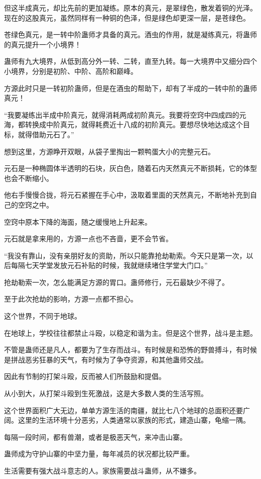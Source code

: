 \begin{this_body}
但这半成真元，却比先前的更加凝练。原本的真元，是翠绿色，散发着铜的光泽。现在的这股真元，虽然同样有一种铜的色泽，但是绿色却更深一层，是苍绿色。

苍绿色真元，是一转中阶蛊师才具备的真元。酒虫的作用，就是凝练真元，将蛊师的真元提升一个小境界！

蛊师有九大境界，从低到高分外一转、二转，直至九转。每一大境界中又细分四个小境界，分别是初阶、中阶、高阶和巅峰。

方源此时只是一转初阶蛊师，但是在酒虫的帮助下，却有了半成的一转中阶的蛊师真元！

“我要凝练出半成中阶真元，就得消耗两成初阶真元。我要将空窍中四成四的元海，都转换成中阶真元，就得耗费近十八成的初阶真元。要想尽快地达成这个目标，就得借助元石了。”

想到这里，方源睁开双眼，从袋子里掏出一颗鸭蛋大小的完整元石。

元石是一种椭圆体半透明的石块，灰白色，随着石内天然真元不断损耗，它的体型也会不断缩小。

他右手慢慢合拢，将元石紧握在手心中，汲取着里面的天然真元，不断地补充到自己的空窍之中。

空窍中原本下降的海面，随之缓慢地上升起来。

元石就是拿来用的，方源一点也不吝啬，更不会节省。

“我没有靠山，没有亲朋好友的资助，所以只能靠抢劫勒索。今天只是第一次，以后每隔七天学堂发放元石补贴的时候，我就继续堵住学堂大门口。”

抢劫勒索一次，怎么能满足方源的胃口。蛊师修行，元石最缺少不得了。

至于此次抢劫的影响，方源一点都不担心。

这个世界，不同于地球。

在地球上，学校往往都禁止斗殴，以稳定和谐为主。但是这个世界，战斗是主题。

不管是蛊师还是凡人，都要为了生存而战斗。有时候是和恐怖的野兽搏斗，有时候是拼战恶劣狂暴的天气，有时候为了争夺资源，和其他蛊师交战。

因此有节制的打架斗殴，反而被人们所鼓励和提倡。

从小到大，从打架斗殴到生死激战，这是大多数人类的生活写照。

这个世界面积广大无边，单单方源生活的南疆，就比七八个地球的总面积还要广阔。这里的生活环境十分恶劣，人类通常以家族的形式，建造山寨，龟缩一隅。

每隔一段时间，都有兽潮，或者是极恶天气，来冲击山寨。

蛊师成为守护山寨的中坚力量，每年减员的状况都比较严重。

生活需要有强大战斗意志的人。家族需要战斗蛊师，从不嫌多。


\end{this_body}
